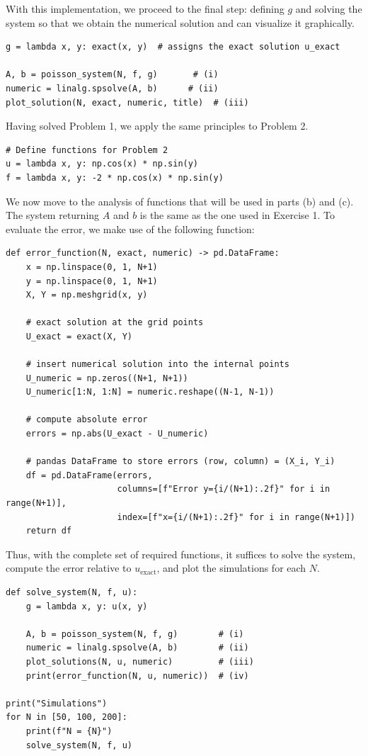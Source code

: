\documentclass[aps,amsmath,amssymb,floatfix]{revtex4}
\begin{document}
With this implementation, we proceed to the final step: defining $g$ and solving the system so that we obtain the numerical solution and can visualize it graphically.

\begin{lstlisting}
g = lambda x, y: exact(x, y)  # assigns the exact solution u_exact

A, b = poisson_system(N, f, g)       # (i)
numeric = linalg.spsolve(A, b)      # (ii)
plot_solution(N, exact, numeric, title)  # (iii)
\end{lstlisting}

Having solved Problem 1, we apply the same principles to Problem 2.

\begin{lstlisting}
# Define functions for Problem 2
u = lambda x, y: np.cos(x) * np.sin(y)
f = lambda x, y: -2 * np.cos(x) * np.sin(y)
\end{lstlisting}

We now move to the analysis of functions that will be used in parts (b) and (c). The system returning $A$ and $b$ is the same as the one used in Exercise 1. To evaluate the error, we make use of the following function:

\begin{lstlisting}
def error_function(N, exact, numeric) -> pd.DataFrame:
    x = np.linspace(0, 1, N+1)
    y = np.linspace(0, 1, N+1)
    X, Y = np.meshgrid(x, y)

    # exact solution at the grid points
    U_exact = exact(X, Y)

    # insert numerical solution into the internal points
    U_numeric = np.zeros((N+1, N+1))
    U_numeric[1:N, 1:N] = numeric.reshape((N-1, N-1))

    # compute absolute error
    errors = np.abs(U_exact - U_numeric)

    # pandas DataFrame to store errors (row, column) = (X_i, Y_i)
    df = pd.DataFrame(errors, 
                      columns=[f"Error y={i/(N+1):.2f}" for i in range(N+1)],
                      index=[f"x={i/(N+1):.2f}" for i in range(N+1)])
    return df   
\end{lstlisting}

Thus, with the complete set of required functions, it suffices to solve the system, compute the error relative to $u_{\text{exact}}$, and plot the simulations for each $N$.

\begin{lstlisting}
def solve_system(N, f, u):
    g = lambda x, y: u(x, y)

    A, b = poisson_system(N, f, g)        # (i)
    numeric = linalg.spsolve(A, b)        # (ii)
    plot_solutions(N, u, numeric)         # (iii)
    print(error_function(N, u, numeric))  # (iv)

print("Simulations")
for N in [50, 100, 200]:
    print(f"N = {N}")
    solve_system(N, f, u)
\end{lstlisting}
\end{document}
